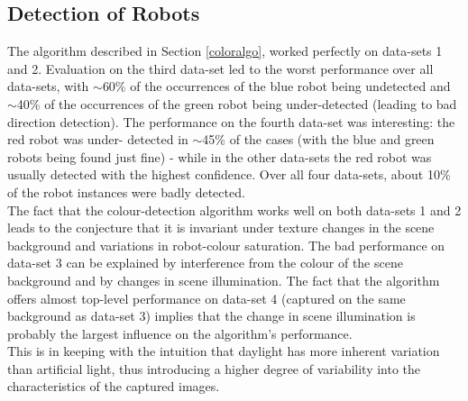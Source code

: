 \documentclass[10pt,a4paper]{article}
\begin{document}
\subsection{Detection of Robots}\label{colorresults}
The algorithm described in Section \ref{coloralgo}, worked perfectly on 
data-sets 1 and 2.
Evaluation on the third data-set led to the worst performance over all data-sets, 
with $\sim$60\% of the occurrences of the blue robot being undetected and 
$\sim$40\% of the occurrences of the green robot being under-detected (leading 
to bad direction detection).
The performance on the fourth data-set was interesting: the red robot was under-
detected in $\sim$45\% of the cases (with the blue and green robots being
found just fine) - while in the other data-sets the red robot was usually
detected with the highest confidence.
Over all four data-sets, about 10\% of the robot instances were badly detected.\\
The fact that the colour-detection algorithm works well on both data-sets 1 and 2
leads to the conjecture that it is invariant under texture changes in the scene 
background and variations in robot-colour saturation.
The bad performance on data-set 3 can be explained by interference from the colour
of the scene background and by changes in scene illumination. The fact that the
algorithm offers almost top-level performance on data-set 4 (captured on the same
background as data-set 3) implies that the change in scene illumination is
probably the largest influence on the algorithm's performance.\\
This is in keeping with the intuition that daylight has more inherent variation
than artificial light, thus introducing a higher degree of variability into the
characteristics of the captured images.
\end{document}

